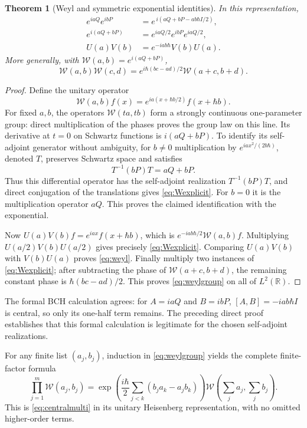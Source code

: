 \documentclass[11pt]{article}
\numberwithin{equation}{section}
\newtheorem{theorem}{Theorem}[section]
\theoremstyle{definition}
\theoremstyle{remark}
\newcommand{\R}{\mathbb{R}}
\begin{document}
\begin{theorem}[Weyl and symmetric exponential identities]
\label{thm:weyl}
In this representation,
\begin{align}
 e^{iaQ}e^{ibP}
   &=e^{\,i(aQ+bP-ab\hbar I/2)},\label{eq:quantumbch}\\
 e^{i(aQ+bP)}
   &=e^{iaQ/2}e^{ibP}e^{iaQ/2},\label{eq:quantumsymmetric}\\
 U(a)V(b)&=e^{-iab\hbar}V(b)U(a).\label{eq:weyl}
\end{align}
More generally, with $\mathcal W(a,b)=e^{i(aQ+bP)}$,
\begin{equation}\label{eq:weylgroup}
 \mathcal W(a,b)\mathcal W(c,d)
 =e^{i\hbar(bc-ad)/2}\mathcal W(a+c,b+d).
\end{equation}
\end{theorem}
\begin{proof}
Define the unitary operator
\begin{equation}\label{eq:Wexplicit}
 \mathcal W(a,b)f(x)=e^{ia(x+\hbar b/2)}f(x+\hbar b).
\end{equation}
For fixed $a,b$, the operators $\mathcal W(ta,tb)$ form a
strongly continuous one-parameter group: direct multiplication of
the phases proves the group law on this line. Its derivative at
$t=0$ on Schwartz functions is $i(aQ+bP)$. To identify its
self-adjoint generator without ambiguity, for $b\ne0$ multiplication
by $e^{iax^2/(2b\hbar)}$, denoted $T$, preserves Schwartz space
and satisfies
\[
 T^{-1}(bP)T=aQ+bP.
\]
Thus this differential operator has the self-adjoint realization
$T^{-1}(bP)T$, and direct conjugation of the translations gives
\eqref{eq:Wexplicit}. For $b=0$ it is the multiplication operator
$aQ$. This proves the claimed identification with the exponential.

Now $U(a)V(b)f=e^{iax}f(x+\hbar b)$, which is
$e^{-iab\hbar/2}\mathcal W(a,b)f$. Multiplying
$U(a/2)V(b)U(a/2)$ gives precisely \eqref{eq:Wexplicit}.
Comparing $U(a)V(b)$ with $V(b)U(a)$ proves \eqref{eq:weyl}.
Finally multiply two instances of \eqref{eq:Wexplicit}; after
subtracting the phase of $\mathcal W(a+c,b+d)$, the remaining
constant phase is $\hbar(bc-ad)/2$. This proves
\eqref{eq:weylgroup} on all of $L^2(\R)$.
\end{proof}
The formal BCH calculation agrees: for $A=iaQ$ and $B=ibP$,
$[A,B]=-iab\hbar I$ is central, so only its one-half term remains.
The preceding direct proof establishes that this formal calculation
is legitimate for the chosen self-adjoint realizations.

For any finite list $(a_j,b_j)$, induction in
\eqref{eq:weylgroup} yields the complete finite-factor formula
\begin{equation}\label{eq:weylmulti}
 \prod_{j=1}^m\mathcal W(a_j,b_j)
 =\exp\left(\frac{i\hbar}{2}
             \sum_{j<k}(b_ja_k-a_jb_k)\right)
   \mathcal W\left(\sum_ja_j,\sum_jb_j\right).
\end{equation}
This is \eqref{eq:centralmulti} in its unitary Heisenberg
representation, with no omitted higher-order terms.
\end{document}
